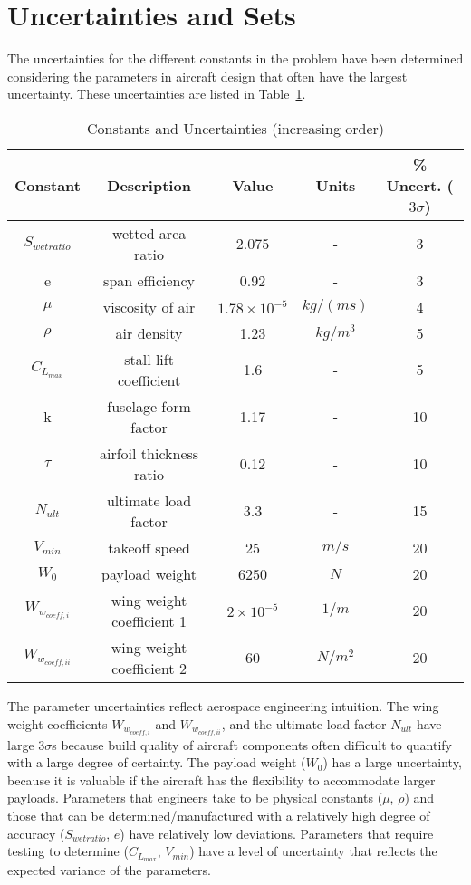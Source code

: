 \section{Uncertainties and Sets}

The uncertainties for the different constants in the problem have been determined
considering the parameters in aircraft design that often have the largest uncertainty.
These uncertainties are listed in Table~\ref{tab:uncertainties}.

\begin{table}
\begin{center}
\caption{\label{tab:uncertainties} Constants and Uncertainties (increasing order)}
\begin{tabular}{c c c c c}
\hline
Constant & Description & Value & Units &\% Uncert. ($3\sigma$) \\
\hline
$S_{wetratio}$ & wetted area ratio & 2.075 & - & 3\\
e & span efficiency & 0.92 & - & 3\\
$\mu$ & viscosity of air & $1.78 \times 10^{-5}$ & $kg/(ms)$ & 4 \\
$\rho$ & air density & 1.23 & $kg/m^3$ & 5 \\
$C_{L_{max}}$ & stall lift coefficient & 1.6 & - & 5\\
k & fuselage form factor & 1.17 & - & 10\\
$\tau$ & airfoil thickness ratio & 0.12 & - & 10\\
$N_{ult}$ & ultimate load factor & 3.3 & - & 15\\
$V_{min}$ & takeoff speed & 25 & $m/s$ & 20\\
$W_0$ & payload weight & 6250 & $N$ & 20\\
$W_{w_{coeff,i}}$ & wing weight coefficient 1 & $2 \times 10^{-5}$ & $1/m$ & 20\\
$W_{w_{coeff,ii}}$ & wing weight coefficient 2 & 60 & $N/m^2$ & 20\\
\hline
\end{tabular}
\end{center}
\end{table}

The parameter uncertainties reflect aerospace engineering intuition.
The wing weight coefficients $W_{w_{coeff,i}}$ and $W_{w_{coeff,ii}}$, and the ultimate load factor $N_{ult}$ have
large $3\sigma$s because build quality of aircraft components often difficult to quantify with a large degree of certainty.
The payload weight ($W_0$) has a large uncertainty, because it is valuable if the aircraft
has the flexibility to accommodate larger payloads. Parameters that engineers take to be
physical constants ($\mu$, $\rho$) and those that can be determined/manufactured with a relatively
high degree of accuracy ($S_{wetratio}$, $e$) have relatively low deviations.
Parameters that require testing to determine ($C_{L_{max}}$, $V_{min}$) have a level of uncertainty
that reflects the expected variance of the parameters.
